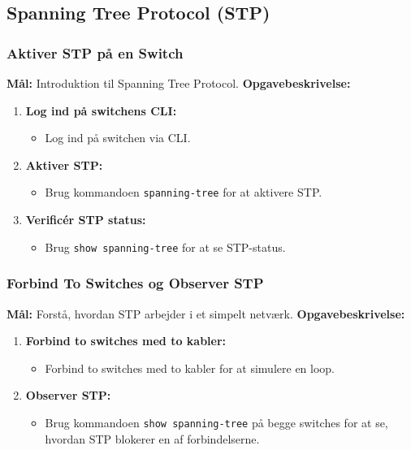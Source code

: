 \subsection{Spanning Tree Protocol (STP)}
\subsubsection*{Aktiver STP på en Switch}
\textbf{Mål:} Introduktion til Spanning Tree Protocol.
\newline\newline\noindent
\textbf{Opgavebeskrivelse:}
\begin{enumerate}
	\item \textbf{Log ind på switchens CLI:}
	\begin{itemize}
		\item Log ind på switchen via CLI.
	\end{itemize}
	\item \textbf{Aktiver STP:}
	\begin{itemize}
		\item Brug kommandoen \texttt{spanning-tree} for at aktivere STP.
	\end{itemize}
	\item \textbf{Verificér STP status:}
	\begin{itemize}
		\item Brug \texttt{show spanning-tree} for at se STP-status.
	\end{itemize}
\end{enumerate}

\subsubsection*{Forbind To Switches og Observer STP}
\textbf{Mål:} Forstå, hvordan STP arbejder i et simpelt netværk.
\newline\newline\noindent
\textbf{Opgavebeskrivelse:}
\begin{enumerate}
	\item \textbf{Forbind to switches med to kabler:}
	\begin{itemize}
		\item Forbind to switches med to kabler for at simulere en loop.
	\end{itemize}
	\item \textbf{Observer STP:}
	\begin{itemize}
		\item Brug kommandoen \texttt{show spanning-tree} på begge switches for at se, hvordan STP blokerer en af forbindelserne.
	\end{itemize}
\end{enumerate}

